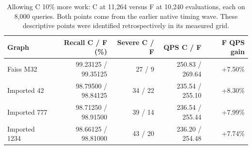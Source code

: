 \begin{table}[t]
\centering
\caption{Allowing C 10\% more work: C at 11,264 versus F at 10,240 evaluations, each on 8,000 queries. Both points come from the earlier native timing wave. These descriptive points were identified retrospectively in its measured grid.}
\label{tab:more}
\small
\begin{tabular}{@{}lrrrr@{}}
\toprule
Graph & Recall C / F (\%) & Severe C / F & QPS C / F & F QPS gain \\
\midrule
Faiss M32 & 99.23125 / 99.35125 & 27 / 9 & 250.83 / 269.64 & +7.50\% \\
Imported 42 & 98.79500 / 98.84125 & 34 / 22 & 235.54 / 255.10 & +8.30\% \\
Imported 777 & 98.71250 / 98.91500 & 39 / 14 & 236.54 / 255.44 & +7.99\% \\
Imported 1234 & 98.66125 / 98.81000 & 43 / 20 & 236.20 / 254.48 & +7.74\% \\
\bottomrule
\end{tabular}
\end{table}
